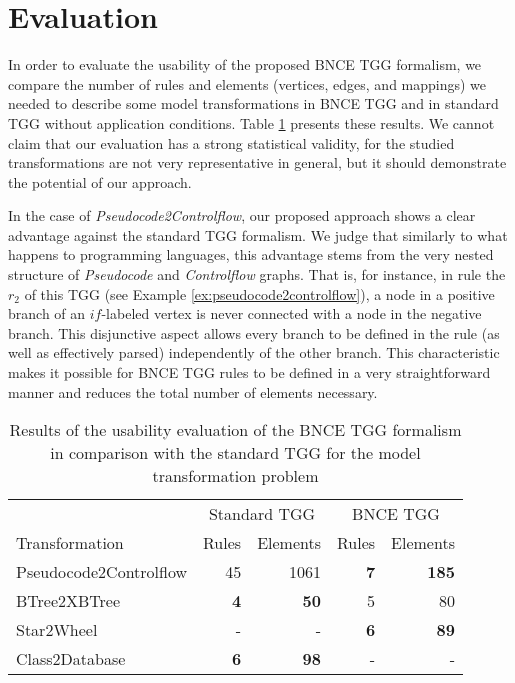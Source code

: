 \documentclass[runningheads]{llncs}
\begin{document}
\section{Evaluation}
\label{sec:eval}
In order to evaluate the usability of the proposed BNCE TGG formalism, we compare the number of rules and elements (vertices, edges, and mappings) we needed to describe some model transformations in BNCE TGG and in standard TGG without application conditions. Table \ref{tab:formalism-eval} presents these results. We cannot claim that our evaluation has a strong statistical validity, for the studied transformations are not very representative in general, but it should demonstrate the potential of our approach.

In the case of \emph{Pseudocode2Controlflow}, our proposed approach shows a clear advantage against the standard TGG formalism. We judge that similarly to what happens to programming languages, this advantage stems from the very nested structure of \emph{Pseudocode} and \emph{Controlflow} graphs. That is, for instance, in rule the $r_2$ of this TGG (see Example \ref{ex:pseudocode2controlflow}), a node in a positive branch of an $if$-labeled vertex is never connected with a node in the negative branch. This disjunctive aspect allows every branch to be defined in the rule (as well as effectively parsed) independently of the other branch. This characteristic makes it possible for BNCE TGG rules to be defined in a very straightforward manner and reduces the total number of elements necessary.

\begin{table}[t]
	\setlength{\tabcolsep}{10pt}
	\centering
	\caption{Results of the usability evaluation of the BNCE TGG formalism in comparison with the standard TGG for the model transformation problem}
	\begin{tabular}{l r r r r }
		\hline
		& \multicolumn{2}{c}{Standard TGG} & \multicolumn{2}{c}{BNCE TGG}\\
		Transformation 			& Rules & Elements 	& Rules & Elements\\
		\hline
		Pseudocode2Controlflow	& 45			& 1061	& \textbf{7}	& \textbf{185} \\
		BTree2XBTree			& \textbf{4}	& \textbf{50}	& 5		& 80 \\
		Star2Wheel				& -				& -		& \textbf{6} 	& \textbf{89} \\
		Class2Database			& \textbf{6}	& \textbf{98}	& -	& - \\
		\hline
	\end{tabular}
	\label{tab:formalism-eval}
\end{table}
\end{document}
